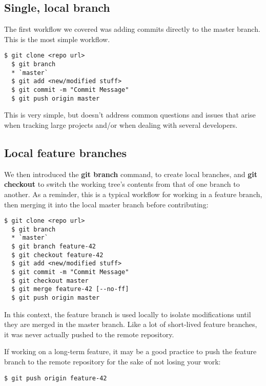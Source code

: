 \documentclass{../../common/tufte-latex/tufte-handout}
\begin{document}
\subsection{Single, local branch}
The first workflow we covered was adding commits directly to the master branch.
This is the most simple workflow.
\begin{lstlisting}[style=BashInputStyle]
  $ git clone <repo url>
  $ git branch
  * `master`
  $ git add <new/modified stuff>
  $ git commit -m "Commit Message"
  $ git push origin master
\end{lstlisting}

This is very simple, but doesn't address common questions and issues that arise when tracking large projects and/or when dealing with several developers.

\subsection{Local feature branches}
We then introduced the \textbf{git branch} command, to create local branches, and \textbf{git checkout} to switch the working tree's contents from that of one branch to another.
As a reminder, this is a typical workflow for working in a feature branch, then merging it into the local master branch before contributing:

\begin{lstlisting}[style=BashInputStyle]
  $ git clone <repo url>
  $ git branch
  * `master`
  $ git branch feature-42 
  $ git checkout feature-42
  $ git add <new/modified stuff>
  $ git commit -m "Commit Message"
  $ git checkout master
  $ git merge feature-42 [--no-ff]
  $ git push origin master
\end{lstlisting}

In this context, the feature branch is used locally to isolate modifications until they are merged in the master branch.
Like a lot of short-lived feature branches, it was never actually pushed to the remote repository.

If working on a long-term feature, it may be a good practice to push the feature branch to the remote repository for the sake of not losing your work:

\begin{lstlisting}[style=BashInputStyle]
  $ git push origin feature-42
\end{lstlisting}
\end{document}
